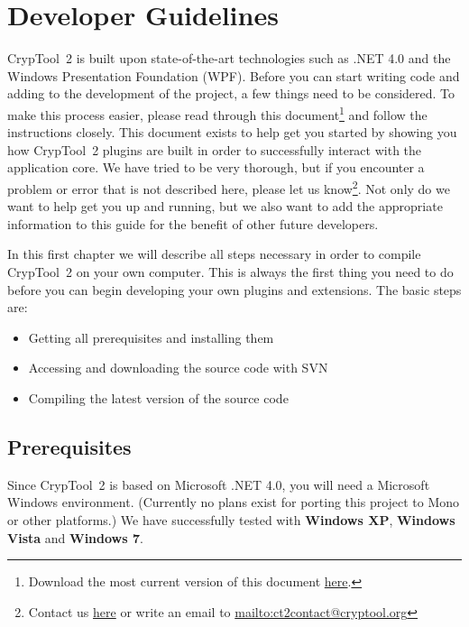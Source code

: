 \chapter{Developer Guidelines}
\label{DeveloperGuidelines}

CrypTool~2 is built upon state-of-the-art technologies such as .NET 4.0 and the Windows Presentation Foundation (WPF). Before you can start writing code and adding to the development of the project, a few things need to be considered. To make this process easier, please read through this document\footnote{Download the most current version of this document \href{https://www.cryptool.org/trac/CrypTool2/browser/trunk/Documentation/PluginHowTo/HowToDeveloper.pdf}{here}.} and follow the instructions closely. This document exists to help get you started by showing you how CrypTool~2 plugins are built in order to successfully interact with the application core. We have tried to be very thorough, but if you encounter a problem or error that is not described here, please let us know\footnote{Contact us \href{https://www.cryptool.org/trac/CrypTool2/wiki/DiscussionGroups}{here} or write an email to \url{mailto:ct2contact@cryptool.org}}. Not only do we want to help get you up and running, but we also want to add the appropriate information to this guide for the benefit of other future developers.

In this first chapter we will describe all steps necessary in order to compile CrypTool~2 on your own computer. This is always the first thing you need to do before you can begin developing your own plugins and extensions. The basic steps are:
\begin{itemize}
	\item Getting all prerequisites and installing them
	\item Accessing and downloading the source code with SVN
	\item Compiling the latest version of the source code
\end{itemize}

\section{Prerequisites}
\label{Prerequisites}

Since CrypTool~2 is based on Microsoft .NET 4.0, you will need a Microsoft Windows environment. (Currently no plans exist for porting this project to Mono or other platforms.) We have successfully tested with \textbf{Windows XP}, \textbf{Windows Vista} and \textbf{Windows 7}.

